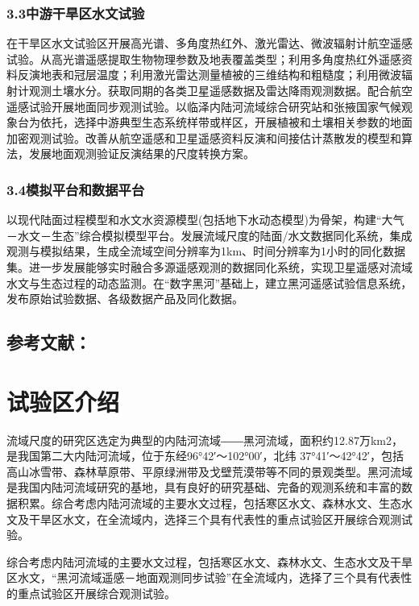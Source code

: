 \documentclass[letterpaper,10pt,english]{sphinxmanual}
\begin{document}
\subsection{3.3中游干旱区水文试验}
\label{water_aims:id24}
在干旱区水文试验区开展高光谱、多角度热红外、激光雷达、微波辐射计航空遥感试验。从高光谱遥感提取生物物理参数及地表覆盖类型；利用多角度热红外遥感资料反演地表和冠层温度；利用激光雷达测量植被的三维结构和粗糙度；利用微波辐射计观测土壤水分。获取同期的各类卫星遥感数据及雷达降雨观测数据。配合航空遥感试验开展地面同步观测试验。以临泽内陆河流域综合研究站和张掖国家气候观象台为依托，选择中游典型生态系统样带或样区，开展植被和土壤相关参数的地面加密观测试验。改善从航空遥感和卫星遥感资料反演和间接估计蒸散发的模型和算法，发展地面观测验证反演结果的尺度转换方案。


\subsection{3.4模拟平台和数据平台}
\label{water_aims:id25}
以现代陆面过程模型和水文水资源模型(包括地下水动态模型)为骨架，构建“大气－水文－生态”综合模拟模型平台。发展流域尺度的陆面/水文数据同化系统，集成观测与模拟结果，生成全流域空间分辨率为1km、时间分辨率为1小时的同化数据集。进一步发展能够实时融合多源遥感观测的数据同化系统，实现卫星遥感对流域水文与生态过程的动态监测。在“数字黑河”基础上，建立黑河遥感试验信息系统，发布原始试验数据、各级数据产品及同化数据。


\section{参考文献：}
\label{water_aims:id26}

\chapter{试验区介绍}
\label{water_experiment_area:water-experiment-area}\label{water_experiment_area::doc}\label{water_experiment_area:id1}
流域尺度的研究区选定为典型的内陆河流域――黑河流域，面积约12.87万km2，是我国第二大内陆河流域，位于东经96°42′～102°00′，北纬 37°41′～42°42′，包括高山冰雪带、森林草原带、平原绿洲带及戈壁荒漠带等不同的景观类型。黑河流域是我国内陆河流域研究的基地，具有良好的研究基础、完备的观测系统和丰富的数据积累。综合考虑内陆河流域的主要水文过程，包括寒区水文、森林水文、生态水文及干旱区水文，在全流域内，选择三个具有代表性的重点试验区开展综合观测试验。

综合考虑内陆河流域的主要水文过程，包括寒区水文、森林水文、生态水文及干旱区水文，“黑河流域遥感－地面观测同步试验”在全流域内，选择了三个具有代表性的重点试验区开展综合观测试验。
\end{document}
